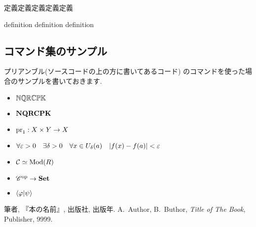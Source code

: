 \begin{Definition}
    定義定義定義定義定義
\end{Definition}

\begin{Defi}
    definition definition definition
\end{Defi}

\subsection*{コマンド集のサンプル}
プリアンブル(ソースコードの上の方に書いてあるコード)
のコマンドを使った場合のサンプルを書いておきます. 
\begin{itemize}
    \item $\mathbb{N} \mathbb{Q} \mathbb{R} \mathbb{C} \mathbb{P} \mathbb{K}$
    \item $\mathbf{N} \mathbf{Q} \mathbf{R} \mathbf{C} \mathbf{P} \mathbf{K}$
    \item $\mathop{\mathrm{pr}}\nolimits_1:X\times Y \to X$
    \item $\forall \varepsilon >0 \quad \exists \delta > 0 \quad 
          \forall x \in U_{\delta}(a) \quad |f(x) - f(a)| < \varepsilon$
    \item ${\mathcal C} \simeq \mathop{\mathrm{Mod}}\nolimits(R)$
    \item ${\mathscr C}^{\rm op} \to {\bf Set}$
    \item $\inner<\pphi | \psi>$
\end{itemize}

\begin{thebibliography}{20} 
     筆者, 『本の名前』, 出版社, 出版年.
     A.\ Author, B.\ Buthor, \textit{Title of The Book}, Publisher, 9999.
\end{thebibliography}






